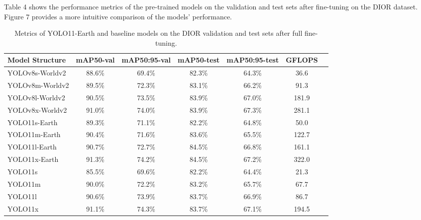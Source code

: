 \documentclass{article}
\begin{document}
Table 4 shows the performance metrics of the pre-trained models on the validation and test sets after 
fine-tuning on the DIOR dataset. Figure 7 provides a more intuitive comparison of the models' performance.
\begin{table}[ht]
\centering
\caption{Metrics of YOLO11-Earth and baseline models on the DIOR validation and test sets after full fine-tuning.}
\begin{tabular}{lcccccc}
\toprule
\textbf{Model Structure} & \textbf{mAP50-val} & \textbf{mAP50:95-val} & \textbf{mAP50-test} & \textbf{mAP50:95-test} & \textbf{GFLOPS} \\
\midrule
YOLOv8s-Worldv2 & 88.6\% & 69.4\% & 82.3\% & 64.3\% & 36.6 \\
YOLOv8m-Worldv2 & 89.5\% & 72.3\% & 83.1\% & 66.2\% & 91.3 \\
YOLOv8l-Worldv2 & 90.5\% & 73.5\% & 83.9\% & 67.0\% & 181.9 \\
YOLOv8x-Worldv2 & 91.0\% & 74.0\% & 83.9\% & 67.3\% & 281.1 \\
\midrule
YOLO11s-Earth & 89.3\% & 71.1\% & 82.2\% & 64.8\% & 50.0 \\
YOLO11m-Earth & 90.4\% & 71.6\% & 83.6\% & 65.5\% & 122.7 \\
YOLO11l-Earth & 90.7\% & 72.7\% & 84.5\% & 66.8\% & 161.1 \\
YOLO11x-Earth & 91.3\% & 74.2\% & 84.5\% & 67.2\% & 322.0 \\
\midrule
YOLO11s & 85.5\% & 69.6\% & 82.2\% & 64.4\% & 21.3 \\
YOLO11m & 90.0\% & 72.2\% & 83.2\% & 65.7\% & 67.7 \\
YOLO11l & 90.6\% & 73.9\% & 83.7\% & 66.9\% & 86.7 \\
YOLO11x & 91.1\% & 74.3\% & 83.7\% & 67.1\% & 194.5 \\
\bottomrule
\end{tabular}
\end{table}
\end{document}
